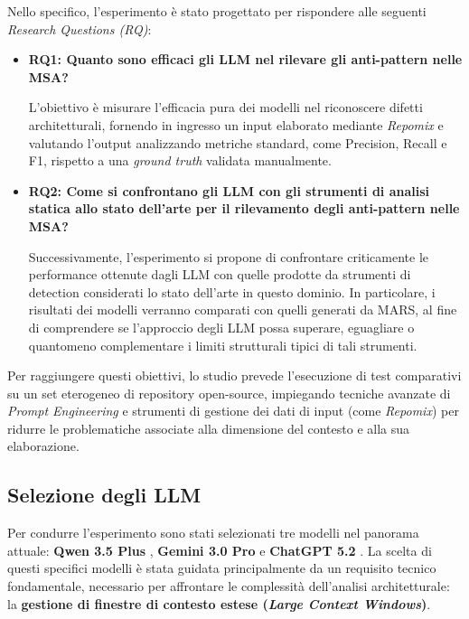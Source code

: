 Nello specifico, l'esperimento è stato progettato per rispondere alle seguenti \textit{Research Questions (RQ)}:
\begin{itemize}
    \item \textbf{RQ1: Quanto sono efficaci gli LLM nel rilevare gli anti-pattern nelle MSA?}

    L'obiettivo è misurare l'efficacia pura dei modelli nel riconoscere difetti architetturali, fornendo in ingresso un input elaborato mediante \textit{Repomix} e valutando l'output analizzando metriche standard, come Precision, Recall e F1, rispetto a una \textit{ground truth} validata manualmente.
    
    \item \textbf{RQ2: Come si confrontano gli LLM con gli strumenti di analisi statica allo stato dell’arte per il rilevamento degli anti-pattern nelle MSA?}

    Successivamente, l'esperimento si propone di confrontare criticamente le performance ottenute dagli LLM con quelle prodotte da strumenti di detection considerati lo stato dell'arte in questo dominio. In particolare, i risultati dei modelli verranno comparati con quelli generati da MARS, al fine di comprendere se l'approccio degli LLM possa superare, eguagliare o quantomeno complementare i limiti strutturali tipici di tali strumenti.

\end{itemize}
Per raggiungere questi obiettivi, lo studio prevede l'esecuzione di test comparativi su un set eterogeneo di repository open-source, impiegando tecniche avanzate di \textit{Prompt Engineering} e strumenti di gestione dei dati di input (come \textit{Repomix}) per ridurre le problematiche associate alla dimensione del contesto e alla sua elaborazione.

\subsection{Selezione degli LLM}

Per condurre l'esperimento sono stati selezionati tre modelli nel panorama attuale: \textbf{Qwen 3.5 Plus} \cite{alibaba2026qwen35}, \textbf{Gemini 3.0 Pro} \cite{deepmind2026gemini31} e \textbf{ChatGPT 5.2} \cite{openai2025gpt52}. La scelta di questi specifici modelli è stata guidata principalmente da un requisito tecnico fondamentale, necessario per affrontare le complessità dell'analisi architetturale: la \textbf{gestione di finestre di contesto estese (\textit{Large Context Windows})}.

